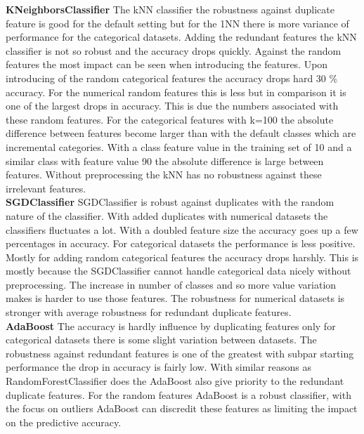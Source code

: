 \documentclass[a4paper,10pt]{article}
\begin{document}
\textbf{KNeighborsClassifier} The kNN classifier the robustness against duplicate feature is good for the default setting but for the 1NN there is more variance of performance for the categorical datasets. Adding the redundant features the kNN classifier is not so robust and the accuracy drops quickly. Against the random features the most impact can be seen when introducing the features. Upon introducing of the random categorical features the accuracy drops hard 30 $\%$ accuracy. For the numerical random features this is less but in comparison it is one of the largest drops in accuracy. This is due the numbers associated with these random features. For the categorical features with k=100 the absolute difference between features become larger than with the default classes which are incremental categories. With a class feature value in the training set of 10 and a similar class with feature value 90 the absolute difference is large between features. Without preprocessing the kNN has no robustness against these irrelevant features. \\

\textbf{SGDClassifier} SGDClassifier is robust against duplicates with the random nature of the classifier. With added duplicates with numerical datasets the classifiers fluctuates a lot. With a doubled feature size the accuracy goes up a few percentages in accuracy. For categorical datasets the performance is less positive. Mostly for adding random categorical features the accuracy drops harshly. This is mostly because the SGDClassifier cannot handle categorical data nicely without preprocessing. The increase in number of classes and so more value variation makes is harder to use those features. The robustness for numerical datasets is stronger with average robustness for redundant duplicate features.  \\

\textbf{AdaBoost} The accuracy is hardly influence by duplicating features only for categorical datasets there is some slight variation between datasets. The robustness against redundant features is one of the greatest with subpar starting performance the drop in accuracy is fairly low. With similar reasons as RandomForestClassifier does the AdaBoost also give priority to the redundant duplicate features. For the random features AdaBoost is a robust classifier, with the focus on outliers AdaBoost can discredit these features as limiting the impact on the predictive accuracy. \\
\end{document}
